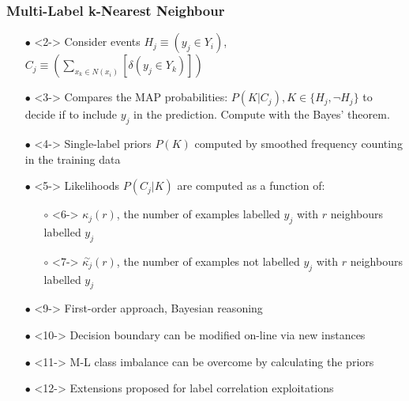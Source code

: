 \documentclass{beamer}
\begin{document}
\begin{frame}
\frametitle{Multi-Label k-Nearest Neighbour}
\begin{itemize}
	\item[$\bullet$] <2-> Consider events $H_j \equiv (y_j \in Y_i)$, $C_j \equiv (\sum_{x_k \in N(x_i)} [\delta(y_j \in Y_k)])$
\item[$\bullet$] <3-> Compares the MAP probabilities: $P(K|C_j), K \in \{H_j, \neg H_j\}$ to decide if to include $y_j$ in the prediction. Compute with the Bayes' theorem.
\item[$\bullet$] <4-> Single-label priors $P(K)$ computed by smoothed frequency counting in the training data
\item[$\bullet$] <5-> Likelihoods $P(C_j|K)$ are computed as a function of:
\begin{itemize}
\item[$\circ$] <6-> $\kappa_j(r)$, the number of examples labelled $y_j$ with $r$ neighbours labelled $y_j$
\item[$\circ$] <7-> $\overset{\sim}{\kappa_j}(r)$, the number of examples not labelled $y_j$ with $r$ neighbours labelled $y_j$
\end{itemize}
\end{itemize}

\begin{itemize}
\item[$\bullet$] <9-> First-order approach, Bayesian reasoning
\item[$\bullet$] <10-> Decision boundary can be modified on-line via new instances
\item[$\bullet$] <11-> M-L class imbalance can be overcome by calculating the priors
\item[$\bullet$] <12-> Extensions proposed for label correlation exploitations
\end{itemize}
\end{frame}
\end{document}

